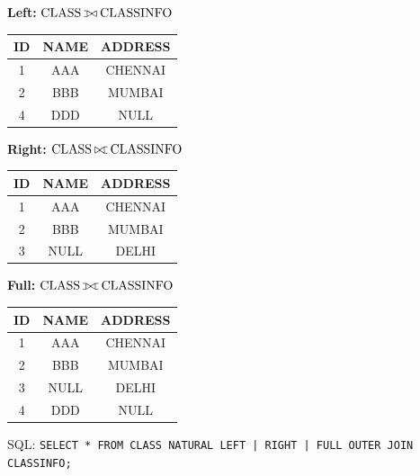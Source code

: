 \documentclass[10pt,a4paper]{article}
\def\ojoin{\setbox0=\hbox{$\bowtie$}\rule[-.02ex]{.25em}{.4pt}\llap{\rule[\ht0]{.25em}{.4pt}}}
\def\lojoin{\mathbin{\ojoin\mkern-5.8mu\bowtie}}
\def\rojoin{\mathbin{\bowtie\mkern-5.8mu\ojoin}}
\def\fojoin{\mathbin{\ojoin\mkern-5.8mu\bowtie\mkern-5.8mu\ojoin}}
\newcommand{\R}[1]{\mathrm{#1}}          %
\begin{document}
\begin{exbox}
\small
\begin{minipage}[t]{0.31\linewidth}\centering
\textbf{Left:} $\R{CLASS} \lojoin \R{CLASSINFO}$\\
\begin{tabular}{ccc}\toprule ID&NAME&ADDRESS\\\midrule 1&AAA&CHENNAI\\2&BBB&MUMBAI\\4&DDD&NULL\\\bottomrule\end{tabular}
\end{minipage}\hfill
\begin{minipage}[t]{0.31\linewidth}\centering
\textbf{Right:} $\R{CLASS} \rojoin \R{CLASSINFO}$\\
\begin{tabular}{ccc}\toprule ID&NAME&ADDRESS\\\midrule 1&AAA&CHENNAI\\2&BBB&MUMBAI\\3&NULL&DELHI\\\bottomrule\end{tabular}
\end{minipage}\hfill
\begin{minipage}[t]{0.31\linewidth}\centering
\textbf{Full:} $\R{CLASS} \fojoin \R{CLASSINFO}$\\
\begin{tabular}{ccc}\toprule ID&NAME&ADDRESS\\\midrule 1&AAA&CHENNAI\\2&BBB&MUMBAI\\3&NULL&DELHI\\4&DDD&NULL\\\bottomrule\end{tabular}
\end{minipage}

\smallskip
SQL: \texttt{SELECT * FROM CLASS NATURAL LEFT | RIGHT | FULL OUTER JOIN CLASSINFO;}
\end{exbox}
\end{document}
